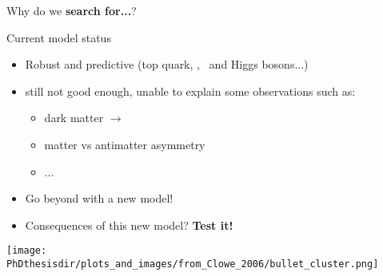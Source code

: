 \begin{frame}

\begin{center}
Why do we \textbf{search for...}?
\end{center}

\pause
\begin{minipage}[c]{.45\textwidth}
\begin{block}{Current model status}
\begin{itemize}
\item Robust and predictive (top quark, \Wboson, \Zboson\ and Higgs bosons...)
\item still not good enough, unable to explain some observations such as:
\begin{itemize}
\item dark matter $\longrightarrow$
\item matter vs antimatter asymmetry
\item ...
\end{itemize}
\item Go beyond with a new model!
\item Consequences of this new model? \textbf{\color{ltcolorred}Test it!}
\end{itemize}
\end{block}
\end{minipage}
\hfill
\begin{minipage}[c]{.45\textwidth}
\begin{center}
\texttt{[image: \\PhDthesisdir/plots\_and\_images/from\_Clowe\_2006/bullet\_cluster.png]}
\end{center}
\end{minipage}
\end{frame}

